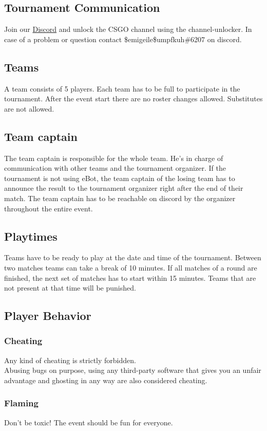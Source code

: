 \documentclass{article}
\begin{document}
\subsection{Tournament Communication}
Join our \href{https://discord.gg/geco}{Discord} and unlock the CSGO channel using the channel-unlocker. In case of a problem or question contact \$emigeile\$umpfkuh\#6207 on discord.

\subsection{Teams}
A team consists of 5 players.
Each team has to be full to participate in the tournament. After the event start there are no roster changes allowed. Substitutes are not allowed.

\subsection{Team captain}
The team captain is responsible for the whole team. He’s in charge of
communication with other teams and the tournament organizer.
If the tournament is not using eBot, the team captain of the losing team has to announce the result to the tournament organizer right after the end of their match. The team captain has to be reachable on discord by the organizer throughout the entire event.


\subsection{Playtimes}
Teams have to be ready to play at the date and time of the tournament. Between two matches teams can take a break of 10 minutes. If all matches of a round are finished, the next set of matches has to start within 15 minutes. Teams that are not present at that time will be punished.

\subsection{Player Behavior}
\subsubsection{Cheating}
Any kind of cheating is strictly forbidden.\\
Abusing bugs on purpose, using any third-party software that gives you an unfair advantage and ghosting in any way are also considered cheating.

\subsubsection{Flaming}
Don't be toxic!
The event should be fun for everyone.
\end{document}
